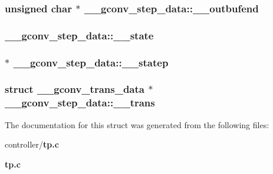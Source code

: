 \subsubsection[{\_\-\_\-outbufend}]{\setlength{\rightskip}{0pt plus 5cm}unsigned char $\ast$ {\bf \_\-\_\-gconv\_\-step\_\-data::\_\-\_\-outbufend}}\label{struct____gconv__step__data_addf9b896149a198aafd9dab49221ae0a}
\subsubsection[{\_\-\_\-state}]{ {\bf \_\-\_\-gconv\_\-step\_\-data::\_\-\_\-state}}\label{struct____gconv__step__data_a2fbe8725dcd7a7b3afa157cfe7e1f7e1}
\subsubsection[{\_\-\_\-statep}]{ $\ast$ {\bf \_\-\_\-gconv\_\-step\_\-data::\_\-\_\-statep}}\label{struct____gconv__step__data_a81a2fb141fe26c8ece6d0b233c280532}
\subsubsection[{\_\-\_\-trans}]{\setlength{\rightskip}{0pt plus 5cm}struct {\bf \_\-\_\-gconv\_\-trans\_\-data} $\ast$ {\bf \_\-\_\-gconv\_\-step\_\-data::\_\-\_\-trans}}\label{struct____gconv__step__data_a09fdf90699abef96932f1205f13d5454}


The documentation for this struct was generated from the following files:\begin{DoxyCompactItemize}
\item 
controller/{\bf tp.c}\item 
{\bf tp.c}\end{DoxyCompactItemize}
